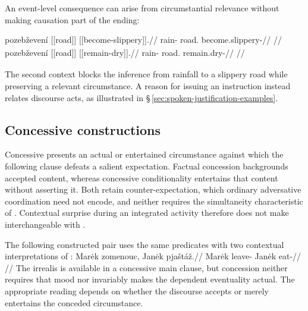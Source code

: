 An event-level consequence can arise from circumstantial relevance
without making causation part of the ending:

\pex\label{ex:slot-event-cause}
\a
\begingl
\gla pozebževení \textnormal{[[road]]}\textsubscript{\Dir{}} \textnormal{[[become-slippery]]}\textsubscript{\Pf{}}.//
\glb rain-\Circ{} road.\Dir{} become.slippery-\Pf{}//
\glft {}
//
\endgl
\a
\begingl
\gla pozebževení \textnormal{[[road]]}\textsubscript{\Dir{}} \textnormal{[[remain-dry]]}\textsubscript{\Cont{}}.//
\glb rain-\Circ{} road.\Dir{} remain.dry-\Cont{}//
\glft {}
//
\endgl
\xe

The second context blocks the inference from rainfall to a slippery
road while preserving a relevant circumstance. A reason for issuing an
instruction instead relates discourse acts, as illustrated in
§\,\ref{sec:spoken-justification-examples}.

\subsection{Concessive constructions}\label{sec:concessive}

Concessive  presents an actual or entertained circumstance against
which the following clause defeats a salient expectation. Factual concession
backgrounds accepted content, whereas concessive conditionality entertains
that content without asserting it. Both retain counter-expectation, which
ordinary adversative coordination need not encode, and neither requires the
simultaneity characteristic of . Contextual surprise during an
integrated activity therefore does not make  interchangeable with
.

The following constructed pair uses the same predicates with two contextual
interpretations of :
\pex\label{ex:concession-actuality}
\a
\begingl
\gla Marėk zomenouc, Janėk pjaštáž.//
\glb Marėk leave-\Cncs{} Janėk eat-\Ctpl{}//
\glft {}
//
\endgl
\a {}
\xe
The irrealis is available in a concessive main clause, but concession neither
requires that mood nor invariably makes the dependent eventuality actual.
The appropriate reading depends on whether the discourse accepts or merely entertains the
conceded circumstance.

